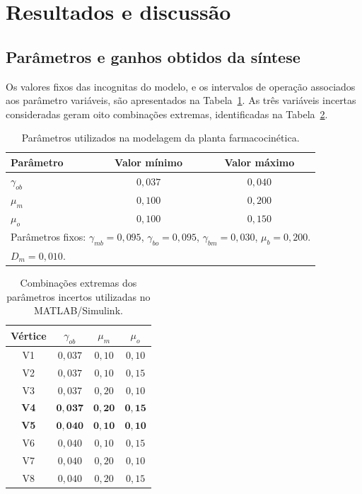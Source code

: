 \section{Resultados e discussão}
\label{sec:resultados}

\subsection{Parâmetros e ganhos obtidos da síntese}
\label{subsec:resultados_sintese}

Os valores fixos das incognitas do modelo, e os intervalos de operação associados aos parâmetro variáveis, são apresentados na Tabela~\ref{tab:parametros_planta}. As três variáveis incertas consideradas geram oito combinações extremas, identificadas na Tabela~\ref{tab:vertices}.

\begin{table}[htbp]
    \centering
    \caption{Parâmetros utilizados na modelagem da planta farmacocinética.}
    \label{tab:parametros_planta}
    \begin{tabular}{lcc}
        \toprule
        Parâmetro & Valor mínimo & Valor máximo\\
        \midrule
        $\gamma_{ob}$ & $0,037$ & $0,040$\\
        $\mu_m$ & $0,100$ & $0,200$\\
        $\mu_o$ & $0,100$ & $0,150$\\
        \midrule
        \multicolumn{3}{l}{Parâmetros fixos: $\gamma_{mb}=0,095$, $\gamma_{bo}=0,095$, $\gamma_{bm}=0,030$, $\mu_b=0,200$.}\\
        \multicolumn{3}{l}{$D_m=0,010$.}\\
        \bottomrule
    \end{tabular}
\end{table}

\begin{table}[htbp]
    \centering
    \caption{Combinações extremas dos parâmetros incertos utilizadas no MATLAB/Simulink.}
    \label{tab:vertices}
    \begin{tabular}{cccc}
        \toprule
        Vértice & $\gamma_{ob}$ & $\mu_m$ & $\mu_o$\\
        \midrule
        V1 & $0,037$ & $0,10$ & $0,10$\\
        V2 & $0,037$ & $0,10$ & $0,15$\\
        V3 & $0,037$ & $0,20$ & $0,10$\\
        \textbf{V4} & $\mathbf{0,037}$ & $\mathbf{0,20}$ & $\mathbf{0,15}$\\
        \textbf{V5} & $\mathbf{0,040}$ & $\mathbf{0,10}$ & $\mathbf{0,10}$\\
        V6 & $0,040$ & $0,10$ & $0,15$\\
        V7 & $0,040$ & $0,20$ & $0,10$\\
        V8 & $0,040$ & $0,20$ & $0,15$\\
        \bottomrule
    \end{tabular}
\end{table}

